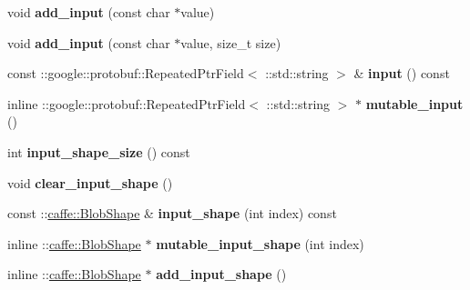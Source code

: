 \begin{DoxyCompactItemize}
void {\bfseries add\+\_\+input} (const char $\ast$value)
\item 
\mbox{\label{classcaffe_1_1_net_parameter_a85f036f4b6acb756d9cf54232f58b92b}} 
void {\bfseries add\+\_\+input} (const char $\ast$value, size\+\_\+t size)
\item 
\mbox{\label{classcaffe_1_1_net_parameter_a04ab869a680eedaa9706f816b4d17bd0}} 
const \+::google\+::protobuf\+::\+Repeated\+Ptr\+Field$<$ \+::std\+::string $>$ \& {\bfseries input} () const
\item 
\mbox{\label{classcaffe_1_1_net_parameter_a1a6bcbc541556904034f0249a9925be9}} 
inline \+::google\+::protobuf\+::\+Repeated\+Ptr\+Field$<$ \+::std\+::string $>$ $\ast$ {\bfseries mutable\+\_\+input} ()
\item 
\mbox{\label{classcaffe_1_1_net_parameter_a0017a2f783838981ab61a8873c35b7d5}} 
int {\bfseries input\+\_\+shape\+\_\+size} () const
\item 
\mbox{\label{classcaffe_1_1_net_parameter_a04707a09fbc2e851638eb99b6615f04e}} 
void {\bfseries clear\+\_\+input\+\_\+shape} ()
\item 
\mbox{\label{classcaffe_1_1_net_parameter_ad37df4cf26028abd15c77f2dec05ccb9}} 
const \+::\mbox{\hyperlink{classcaffe_1_1_blob_shape}{caffe\+::\+Blob\+Shape}} \& {\bfseries input\+\_\+shape} (int index) const
\item 
\mbox{\label{classcaffe_1_1_net_parameter_af5252aeaf87cc0c101e1c973dbcdea3a}} 
inline \+::\mbox{\hyperlink{classcaffe_1_1_blob_shape}{caffe\+::\+Blob\+Shape}} $\ast$ {\bfseries mutable\+\_\+input\+\_\+shape} (int index)
\item 
\mbox{\label{classcaffe_1_1_net_parameter_a1254fd46208c885116d917d2c6848a6c}} 
inline \+::\mbox{\hyperlink{classcaffe_1_1_blob_shape}{caffe\+::\+Blob\+Shape}} $\ast$ {\bfseries add\+\_\+input\+\_\+shape} ()
\item 
\mbox{\label{classcaffe_1_1_net_parameter_a18d22abd8e09f4d7f24a00718d768a36}} 

\end{DoxyCompactItemize}
